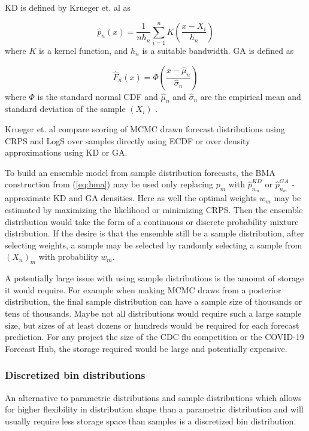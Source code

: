 \documentclass[11pt,notitlepage]{isuthesis}
\begin{document}
KD is defined by Krueger et. al as

\begin{equation}
\label{eq:kd}
  \hat{p}_n(x) = \frac{1}{n h_n} \sum_{i=1}^n K \left( \frac{x-X_i}{h_n} \right) 
\end{equation}
where $K$ is a kernel function, and $h_n$ is a suitable bandwidth. GA is defined
as 

\begin{equation}
\label{eq:ga}
  \hat{F}_n(x) = \Phi  \left( \frac{x-\hat{\mu}_n}{\hat{\sigma}_n} \right)
\end{equation}
where $\Phi$ is the standard normal CDF and $\hat{\mu}_n$ and $\hat{\sigma}_n$
are the empirical mean and standard deviation of the sample $(X_i)$
\cite{krueger2016probabilistic}.

Krueger et. al compare scoring of MCMC drawn forecast distributions using CRPS 
and LogS over samples directly using ECDF or over density approximations using
KD or GA.

To build an ensemble model from sample distribution forecasts, the BMA 
construction from (\ref{eq:bma}) may be used only replacing $p_m$ with 
$\hat{p}_{n_m}^{KD}$ or $\hat{p}_{n_m}^{GA}$ -approximate KD and GA densities. 
Here as well the optimal weights 
$w_m$ may be estimated by maximizing the likelihood or minimizing CRPS. Then 
the ensemble distribution would take the form of a continuous or discrete
probability mixture distribution. If the desire is that the ensemble still be
a sample distribution, after selecting weights, a sample may be selected by 
randomly selecting a sample from $(X_n)_m$ with probability $w_m$.

A potentially large issue with using sample distributions is the amount of storage
it would require. For example when making MCMC draws from a posterior 
distribution, the final sample distribution can have a sample size of thousands
or tens of thousands. Maybe not all distributions would require such a large 
sample size, but sizes of at least dozens or hundreds would be required for each
forecast prediction. For any project the size of the CDC flu competition or the
COVID-19 Forecast Hub, the storage required would be large and potentially 
expensive.

\subsubsection{Discretized bin distributions}
An alternative to parametric distributions and sample distributions which allows
for higher flexibility in distribution shape than a parametric distribution and 
will usually require less storage space than samples is a discretized bin 
distribution.
\end{document}

